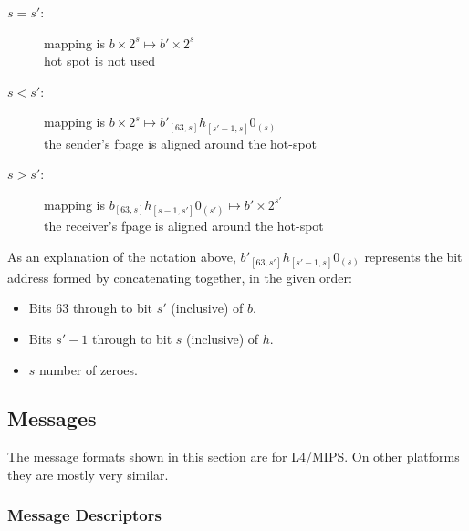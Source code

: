 \begin{description}

\item[$s = s'$:] mapping is $b \times 2^{s} \mapsto b' \times 2^{s}$
  \\ hot spot is not used

\item[$s < s'$:] mapping is $b \times 2^{s} \mapsto b'_{[63, s]}
  h_{[s' - 1, s]}0_{(s)}$ \\ the sender's fpage is aligned around the
  hot-spot

\item[$s > s'$:] mapping is $b_{[63, s]}h_{[s - 1, s']}0_{(s')}
  \mapsto b' \times 2^{s'}$\\ the receiver's fpage is aligned around
  the hot-spot

\end{description}

As an explanation of the notation above, $b'_{[63, s']}h_{[s' - 1,
  s]}0_{(s)}$ represents the bit address formed by concatenating
together, in the given order:

\begin{itemize}

\item Bits 63 through to bit $s'$ (inclusive) of $b$.
        
\item Bits $s' - 1$ through to bit $s$ (inclusive) of $h$.

\item $s$ number of zeroes.

\end{itemize}   


\subsection{Messages}


\label{sec:messages}

The message formats shown in this section are for L4/MIPS. On other
platforms they are mostly very similar.


\subsubsection{Message Descriptors}

